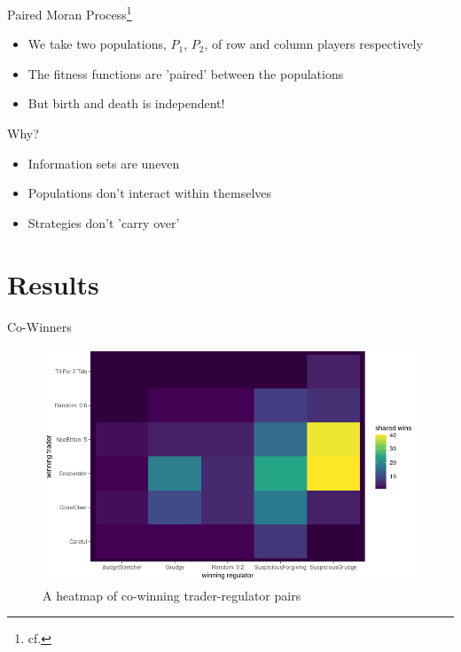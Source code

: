 \documentclass{beamer}
\begin{document}
\begin{frame}{Paired Moran Process\footnote{cf. }}
\begin{itemize}
\item We take two populations, $P_1$, $P_2$, of row and column players respectively
\item The fitness functions are 'paired' between the populations
\item But birth and death is independent!
\end{itemize}
\end{frame}

\begin{frame}{Why?}
\begin{itemize}
    \item Information sets are uneven
    \item Populations don't interact within themselves
    \item Strategies don't 'carry over'
\end{itemize}
\end{frame}


\section{Results}
\begin{frame}{Co-Winners}
\begin{figure}[!h]
    \includegraphics[width=\textwidth]{heatmap.png}
    \caption{A heatmap of co-winning trader-regulator pairs}
    \label{fig:f1}
\end{figure}
\end{frame}
\end{document}
